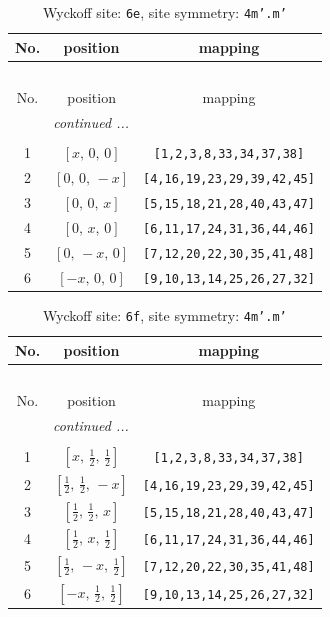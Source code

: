\documentclass[fleqn,8pt]{jsarticle}
\begin{document}
\renewcommand{\arraystretch}{1.2}
\begin{longtable}{ccc}
\caption{Wyckoff site: {\tt 6e}, site symmetry: {\tt 4m'.m'}}
 \\
 \hline \hline
No. & position & mapping \\ \hline \endfirsthead

\multicolumn{2}{l}{\tablename\ \thetable{}} \\
 \hline \hline
No. & position & mapping \\ \hline \endhead

 \hline \hline
\multicolumn{2}{r}{\footnotesize\it continued ...} \\ \endfoot

 \hline \hline
\multicolumn{2}{r}{} \\ \endlastfoot

1 & $\left[ x,\, 0,\, 0 \right]$ & {\tt [1,2,3,8,33,34,37,38]} \\ \hline
2 & $\left[ 0,\, 0,\, - x \right]$ & {\tt [4,16,19,23,29,39,42,45]} \\ \hline
3 & $\left[ 0,\, 0,\, x \right]$ & {\tt [5,15,18,21,28,40,43,47]} \\ \hline
4 & $\left[ 0,\, x,\, 0 \right]$ & {\tt [6,11,17,24,31,36,44,46]} \\ \hline
5 & $\left[ 0,\, - x,\, 0 \right]$ & {\tt [7,12,20,22,30,35,41,48]} \\ \hline
6 & $\left[ - x,\, 0,\, 0 \right]$ & {\tt [9,10,13,14,25,26,27,32]} \\
\end{longtable}
\renewcommand{\arraystretch}{1.2}
\begin{longtable}{ccc}
\caption{Wyckoff site: {\tt 6f}, site symmetry: {\tt 4m'.m'}}
 \\
 \hline \hline
No. & position & mapping \\ \hline \endfirsthead

\multicolumn{2}{l}{\tablename\ \thetable{}} \\
 \hline \hline
No. & position & mapping \\ \hline \endhead

 \hline \hline
\multicolumn{2}{r}{\footnotesize\it continued ...} \\ \endfoot

 \hline \hline
\multicolumn{2}{r}{} \\ \endlastfoot

1 & $\left[ x,\, \frac{1}{2},\, \frac{1}{2} \right]$ & {\tt [1,2,3,8,33,34,37,38]} \\ \hline
2 & $\left[ \frac{1}{2},\, \frac{1}{2},\, - x \right]$ & {\tt [4,16,19,23,29,39,42,45]} \\ \hline
3 & $\left[ \frac{1}{2},\, \frac{1}{2},\, x \right]$ & {\tt [5,15,18,21,28,40,43,47]} \\ \hline
4 & $\left[ \frac{1}{2},\, x,\, \frac{1}{2} \right]$ & {\tt [6,11,17,24,31,36,44,46]} \\ \hline
5 & $\left[ \frac{1}{2},\, - x,\, \frac{1}{2} \right]$ & {\tt [7,12,20,22,30,35,41,48]} \\ \hline
6 & $\left[ - x,\, \frac{1}{2},\, \frac{1}{2} \right]$ & {\tt [9,10,13,14,25,26,27,32]} \\
\end{longtable}
\end{document}
